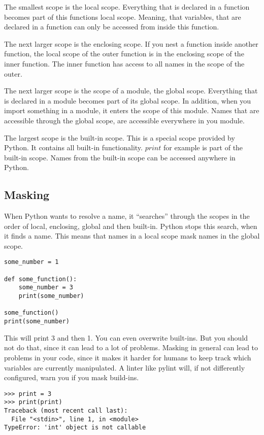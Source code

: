 \documentclass{article}
\newcommand{\qq}[1]{``#1''}
\begin{document}
The smallest scope is the local scope.
Everything that is declared in a function becomes part of this functions local scope.
Meaning, that variables, that are declared in a function can only be accessed
from inside this function.

The next larger scope is the enclosing scope.
If you nest a function inside another function, the local scope of the outer function
is in the enclosing scope of the inner function.
The inner function has access to all names in the scope of the outer.

The next larger scope is the scope of a module, the global scope.
Everything that is declared in a module becomes part of its global scope.
In addition, when you import something in a module, it enters the scope of this module.
Names that are accessible through the global scope, are accessible everywhere in
you module.

The largest scope is the built-in scope.
This is a special scope provided by Python.
It contains all built-in functionality.
$print$ for example is part of the built-in scope.
Names from the built-in scope can be accessed anywhere in Python.

\subsection{Masking}

When Python wants to resolve a name, it \qq{searches} through the scopes in the order
of local, enclosing, global and then built-in.
Python stops this search, when it finds a name.
This means that names in a local scope mask names in the global scope.

\begin{lstlisting}
some_number = 1

def some_function():
    some_number = 3
    print(some_number)

some_function()
print(some_number)
\end{lstlisting}

This will print 3 and then 1.
You can even overwrite built-ins.
But you should not do that, since it can lead to a lot of problems.
Masking in general can lead to problems in your code, since it makes it harder
for humans to keep track which variables are currently manipulated.
A linter like pylint will, if not differently configured, warn you if you mask
build-ins.

\begin{lstlisting}
>>> print = 3
>>> print(print)
Traceback (most recent call last):
  File "<stdin>", line 1, in <module>
TypeError: 'int' object is not callable
\end{lstlisting}
\end{document}
